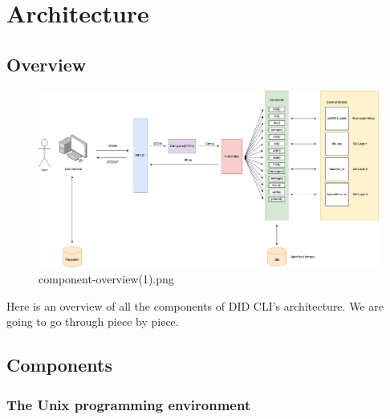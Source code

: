 \hypertarget{architecture}{%
\chapter{Architecture}\label{architecture}}

\hypertarget{overview}{%
\section{Overview}\label{overview}}

\begin{figure}
\centering
\includegraphics{Architecture 1442df162dbe45f4a423ba37d3e12363/component-overview(1).png}
\caption{component-overview(1).png}
\end{figure}

Here is an overview of all the components of DID CLI's architecture. We
are going to go through piece by piece.

\hypertarget{components}{%
\section{Components}\label{components}}

\hypertarget{the-unix-programming-environment}{%
\subsection{The Unix programming
environment}\label{the-unix-programming-environment}}

